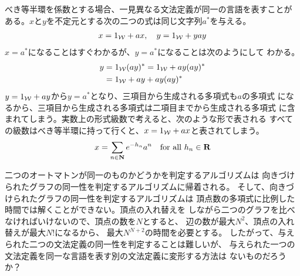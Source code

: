 {	\begin{todo}[べき等半環の特殊性]\label{todo:べき等半環の特殊性} %
		べき等半環を係数とする場合、一見異なる文法定義が同一の言語を表すことが
		ある。$x$と$y$を不定元とする次の二つの式は同じ文字列$a^*$を与える。
		\begin{equation*}\begin{split}
			x = 1_{{\mathcal{W}}} + ax,\quad y = 1_{{\mathcal{W}}} + yay
		\end{split}\end{equation*}
		$x=a^*$になることはすぐわかるが、$y=a^*$になることは次のようにして
		わかる。
		\begin{equation*}\begin{split}
			y &= 1_{{\mathcal{W}}}(ay)^* = 1_{{\mathcal{W}}} + ay(ay)^* \\
			&= 1_{{\mathcal{W}}} + ay + ay(ay)^*
		\end{split}\end{equation*}
		$y=1_{{\mathcal{W}}}+ay$から$y=a^*$となり、三項目から生成される多項式も$a$の多項式
		になるから、三項目から生成される多項式は二項目までから生成される多項式
		に含まれてしまう。実数上の形式級数で考えると、次のような形で表される
		すべての級数はべき等半環に持って行くと、$x=1_{{\mathcal{W}}}+ax$と表されてしまう。
		\begin{equation*}\begin{split}
			x = \sum_{n\in\mathbf{N}}e^{-h_n}a^n \quad\text{for all }h_n\in\mathbf{R}
		\end{split}\end{equation*}

		二つのオートマトンが同一のものかどうかを判定するアルゴリズムは
		向きづけられたグラフの同一性を判定するアルゴリズムに帰着される。
		そして、向きづけられたグラフの同一性を判定するアルゴリズムは
		頂点数の多項式に比例した時間では解くことができない。頂点の入れ替えを
		しながら二つのグラフを比べなければいけないので、頂点の数を$N$とすると、
		辺の数が最大$N^2$、頂点の入れ替えが最大$N!$になるから、
		最大$N^{N+2}$の時間を必要とする。
		したがって、与えられた二つの文法定義の同一性を判定することは難しいが、
		与えられた一つの文法定義を同一な言語を表す別の文法定義に変形する方法は
		ないものだろうか？
	\end{todo} %

}
